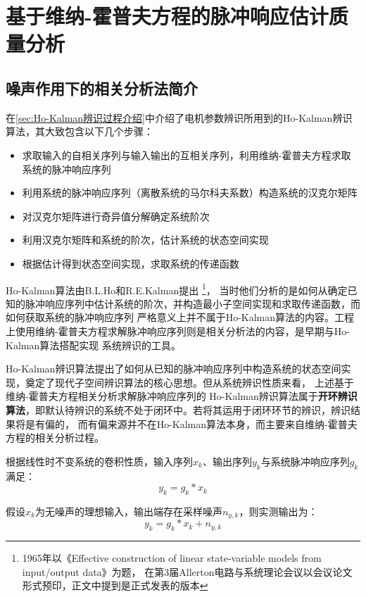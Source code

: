 \newpage
\section{基于维纳-霍普夫方程的脉冲响应估计质量分析}
\label{sec:基于维纳-霍普夫方程的脉冲响应估计质量分析}
\subsection{噪声作用下的相关分析法简介\label{sec:噪声作用下的相关分析法简介}}
在\ref{sec:Ho-Kalman辨识过程介绍}中介绍了电机参数辨识所用到的Ho-Kalman辨识算法，其大致包含以下几个步骤：
\begin{itemize}
    \item 求取输入的自相关序列与输入输出的互相关序列，利用维纳-霍普夫方程求取系统的脉冲响应序列
    \item 利用系统的脉冲响应序列（离散系统的马尔科夫系数）构造系统的汉克尔矩阵
    \item 对汉克尔矩阵进行奇异值分解确定系统阶次
    \item 利用汉克尔矩阵和系统的阶次，估计系统的状态空间实现
    \item 根据估计得到状态空间实现，求取系统的传递函数
\end{itemize}

Ho-Kalman算法由B.L.Ho和R.E.Kalman提出\cite{HoKalman1966}
\footnote{1965年以《Effective construction of linear state-variable models from input/output data》为题，
在第3届Allerton电路与系统理论会议以会议论文形式预印，正文中提到是正式发表的版本}，
当时他们分析的是如何从确定已知的脉冲响应序列中估计系统的阶次，并构造最小子空间实现和求取传递函数，而如何获取系统的脉冲响应序列
严格意义上并不属于Ho-Kalman算法的内容。工程上使用维纳-霍普夫方程求解脉冲响应序列则是相关分析法的内容，是早期与Ho-Kalman算法搭配实现
系统辨识的工具。

Ho-Kalman辨识算法提出了如何从已知的脉冲响应序列中构造系统的状态空间实现，奠定了现代子空间辨识算法的核心思想。但从系统辨识性质来看，
上述基于维纳-霍普夫方程相关分析求解脉冲响应序列的
Ho-Kalman辨识算法属于\textbf{开环辨识算法}，即默认待辨识的系统不处于闭环中。若将其运用于闭环环节的辨识，辨识结果将是有偏的，
而有偏来源并不在Ho-Kalman算法本身，而主要来自维纳-霍普夫方程的相关分析过程。

根据线性时不变系统的卷积性质，输入序列\(x_k\)、输出序列\(y_k\)与系统脉冲响应序列\(g_k\)满足：
\begin{equation*}
    y_k = g_k * x_k
\end{equation*}

假设\(x_k\)为无噪声的理想输入，输出端存在采样噪声\(n_{y,k}\)，则实测输出为：
\begin{equation*}
    y_k = g_k * x_k + n_{y,k}
\end{equation*}

